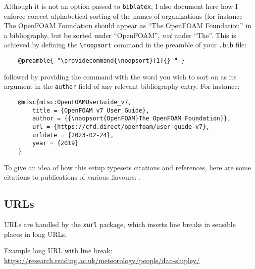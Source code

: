 Although it is not an option passed to \verb!biblatex!, I also document here how I enforce correct alphabetical sorting of the names of organizations (for instance The OpenFOAM Foundation should appear as ``The OpenFOAM Foundation'' in a bibliography, but be sorted under ``OpenFOAM'', \textit{not} under ``The''.
This is achieved by defining the \verb!\noopsort! command in the preamble of your \verb!.bib! file:
\begin{verbatim}
    @preamble{ "\providecommand{\noopsort}[1]{} " }
\end{verbatim}
followed by providing the command with the word you wish to sort on as its argument in the \verb!author! field of any relevant bibliography entry.
For instance:
\begin{verbatim}
    @misc{misc:OpenFOAMUserGuide_v7,
        title = {OpenFOAM v7 User Guide},
        author = {{\noopsort{OpenFOAM}The OpenFOAM Foundation}},
        url = {https://cfd.direct/openfoam/user-guide-v7},
        urldate = {2023-02-24},
        year = {2019}
    }
\end{verbatim}

To give an idea of how this setup typesets citations and references, here are some citations to publications of various flavours: \textcite{bk:AchesonElementaryFD,ch:Kasahara2001,ch:BoisKubicki2002,talk:Doering2021MSRI,report:Behrens2009,misc:OpenFOAMUserGuide_v7}.

\subsection{URLs}
URLs are handled by the \verb!xurl! package, which inserts line breaks in sensible places in long URLs.

Example long URL with line break: \url{https://research.reading.ac.uk/meteorology/people/dan-shipley/}

